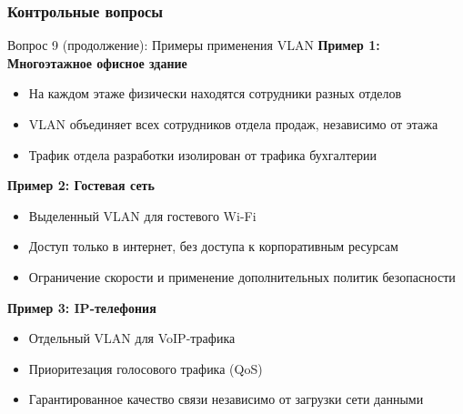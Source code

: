 \begin{frame}
\frametitle{Контрольные вопросы}
\begin{block}{Вопрос 9 (продолжение): Примеры применения VLAN}
\textbf{Пример 1: Многоэтажное офисное здание}
\begin{itemize}
    \item На каждом этаже физически находятся сотрудники разных отделов
    \item VLAN объединяет всех сотрудников отдела продаж, независимо от этажа
    \item Трафик отдела разработки изолирован от трафика бухгалтерии
\end{itemize}

\textbf{Пример 2: Гостевая сеть}
\begin{itemize}
    \item Выделенный VLAN для гостевого Wi-Fi
    \item Доступ только в интернет, без доступа к корпоративным ресурсам
    \item Ограничение скорости и применение дополнительных политик безопасности
\end{itemize}

\textbf{Пример 3: IP-телефония}
\begin{itemize}
    \item Отдельный VLAN для VoIP-трафика
    \item Приоритезация голосового трафика (QoS)
    \item Гарантированное качество связи независимо от загрузки сети данными
\end{itemize}
\end{block}
\end{frame}

